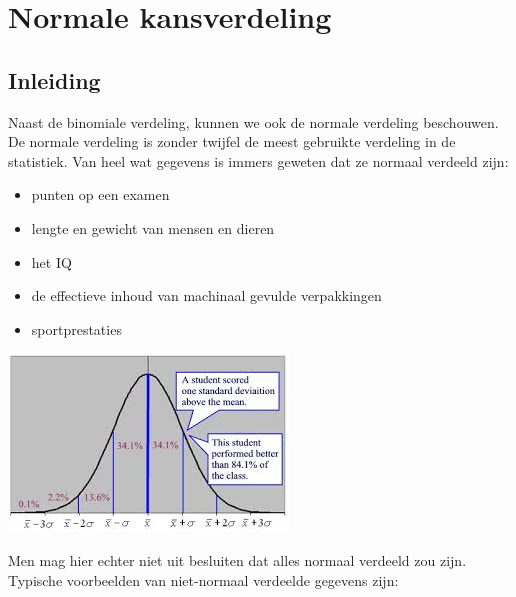 \documentclass[a4paper,12pt, twoside]{article}
\begin{document}
\cleardoublepage
\section{Normale kansverdeling}

\subsection{Inleiding}

Naast de binomiale verdeling, kunnen we ook de normale verdeling beschouwen. De normale verdeling is zonder twijfel de meest gebruikte verdeling in de statistiek. Van heel wat gegevens is immers geweten dat ze normaal verdeeld zijn:

\begin{minipage}{0.5\textwidth}
\begin{itemize}
  \item punten op een examen
  \item lengte en gewicht van mensen en dieren
  \item het IQ
  \item de effectieve inhoud van machinaal gevulde verpakkingen
  \item sportprestaties
\end{itemize}
\vspace*{1cm}
\end{minipage}
\begin{minipage}{0.5\textwidth}
  \begin{center}
    \includegraphics[width=\textwidth]{student_score}
  \end{center}
\end{minipage}

Men mag hier echter niet uit besluiten dat alles normaal verdeeld zou zijn. Typische voorbeelden van niet-normaal verdeelde gegevens zijn:
\end{document}
